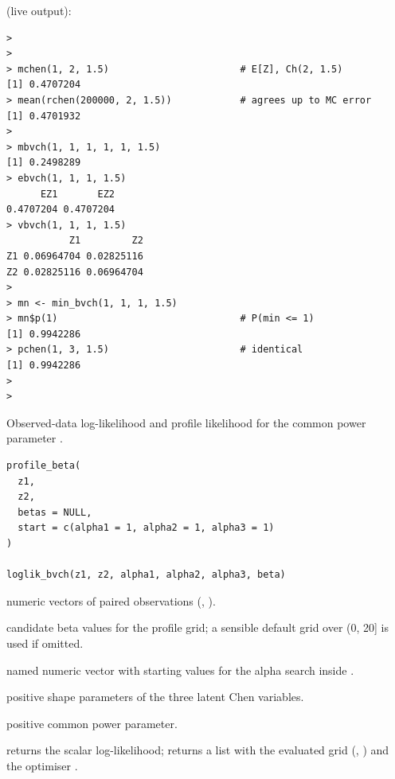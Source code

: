 \documentclass[11pt,a4paper]{article}
\begin{document}
\vspace{0.8em}
 (live output):
\begin{lstlisting}
> 
> 
> mchen(1, 2, 1.5)                       # E[Z], Ch(2, 1.5)
[1] 0.4707204
> mean(rchen(200000, 2, 1.5))            # agrees up to MC error
[1] 0.4701932
> 
> mbvch(1, 1, 1, 1, 1, 1.5)
[1] 0.2498289
> ebvch(1, 1, 1, 1.5)
      EZ1       EZ2 
0.4707204 0.4707204 
> vbvch(1, 1, 1, 1.5)
           Z1         Z2
Z1 0.06964704 0.02825116
Z2 0.02825116 0.06964704
> 
> mn <- min_bvch(1, 1, 1, 1.5)
> mn$p(1)                                # P(min <= 1)
[1] 0.9942286
> pchen(1, 3, 1.5)                       # identical
[1] 0.9942286
> 
> 
\end{lstlisting}


\newpage

%
\begin{Description}
Observed-data log-likelihood and profile likelihood for
the common power parameter \eqn{\beta}{}.
\end{Description}
%
\begin{Usage}
\begin{verbatim}
profile_beta(
  z1,
  z2,
  betas = NULL,
  start = c(alpha1 = 1, alpha2 = 1, alpha3 = 1)
)

loglik_bvch(z1, z2, alpha1, alpha2, alpha3, beta)
\end{verbatim}
\end{Usage}
%
\begin{Arguments}
\begin{ldescription}
\item[\code{z1}, \code{z2}] numeric vectors of paired observations
(, ).

\item[\code{betas}] candidate beta values for the profile grid; a sensible
default grid over (0, 20] is used if omitted.

\item[\code{start}] named numeric vector with starting values for the
alpha search inside .

\item[\code{alpha1}, \code{alpha2}, \code{alpha3}] positive shape parameters of the three
latent Chen variables.

\item[\code{beta}] positive common power parameter.
\end{ldescription}
\end{Arguments}
%
\begin{Value}
 returns the scalar log-likelihood;
 returns a list with the evaluated grid
(, ) and the optimiser
.
\end{Value}
%
\end{document}
